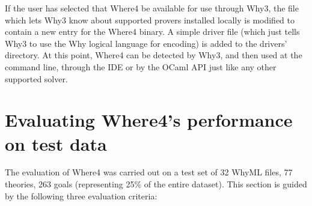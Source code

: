 \documentclass[submission,copyright,creativecommons]{eptcs}
\begin{document}
If the user has selected that \textsf{Where4} be available for use through \textsf{Why3}, the file which lets \textsf{Why3} know about supported provers installed locally is modified to contain a new entry for the \textsf{Where4} binary. A simple driver file (which just tells \textsf{Why3} to use the Why logical language for encoding) is added to the drivers' directory. At this point, \textsf{Where4} can be detected by \textsf{Why3}, and then used at the command line, through the IDE or by the OCaml API just like any other supported solver. 

\section{Evaluating \textsf{Where4}'s performance on test data}
\label{sec:eval}



The evaluation of \textsf{Where4} was carried out on a test set of 32 WhyML files, 77 theories, 263 goals (representing 25\% of the entire dataset). This section is guided by the following three evaluation criteria:
\end{document}

